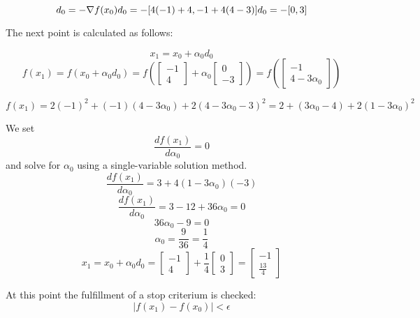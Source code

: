 \documentclass[]{article}
\begin{document}
\[d_0 = - \nabla f(x_0) \\
d_0 = -[4(-1)+4, -1+4(4-3)]\\
d_0 = -[0,3]\]

The next point is calculated as follows:

\[ x_1 = x_0 + \alpha_0 d_0\]
\[f(x_1) = f (x_0 + \alpha_0 d_0) = f ( \left[
\begin{array}
{c}
-1 \\
4 
\end{array}\right] +
\alpha_0 \left[ \begin{array}
{c}
0 \\
-3 
\end{array}\right] 
) = f(\left[
\begin{array}
{c}
-1 \\
4-3\alpha_0
\end{array}\right]) \]

\[f(x_1) = 2(-1)^2 + (-1)(4-3\alpha_0) +2(4-3\alpha_0-3)^2 = 2 + (3\alpha_0 - 4) + 2(1-3\alpha_0)^2\]

We set \[\frac {df(x_1)} {d\alpha_0} = 0\] and solve for \(\alpha_0\)
using a single-variable solution method.
\[\frac{df(x_1)} {d\alpha_0} =  3+4(1-3\alpha_0)(-3)\]
\[\frac {df(x_1)} {d\alpha_0} = 3-12+36\alpha_0 = 0\]
\[36 \alpha_0 -9 = 0\] \[\alpha_0 = \frac {9}  {36} = \frac {1}  {4}\]
\[x_1 = x_0 + \alpha_0 d_0 =  \left[
\begin{array}
{c}
-1 \\
4 
\end{array}\right] +
\frac{1}{4} \left[
\begin{array}
{c}
0 \\
3 
\end{array}\right] = \left[
\begin{array}
{c}-1 \\
\frac{13}{4}
\end{array}\right]\]

At this point the fulfillment of a stop criterium is checked:
\[|f(x_1) - f(x_0)| < \epsilon \]
\end{document}
